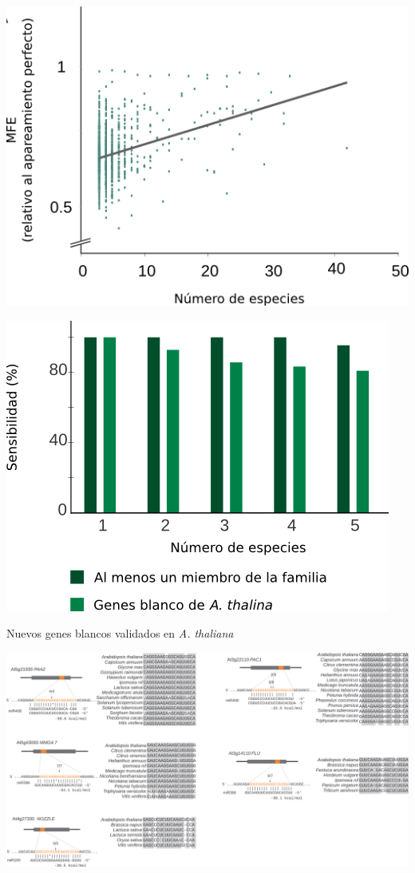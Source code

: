 \documentclass{beamer}
\begin{document}
\begin{frame}{}
	\begin{center}
	\end{center}
\end{frame}

\begin{frame}{}
	\begin{center}
		\includegraphics[width=.5\textwidth]{img/extras/NAR_fig3A.png}
	\end{center}
\end{frame}

\begin{frame}{}
	\begin{center}
		\includegraphics[width=.5\textwidth]{img/extras/NAR_fig3B.png}
	\end{center}
\end{frame}

\begin{frame}{Nuevos genes blancos validados en \textit{A. thaliana}}
	\begin{center}
		\includegraphics[width=1\textwidth]{img/Figure4_retocada.png}
	\end{center}
\end{frame}
\end{document}
